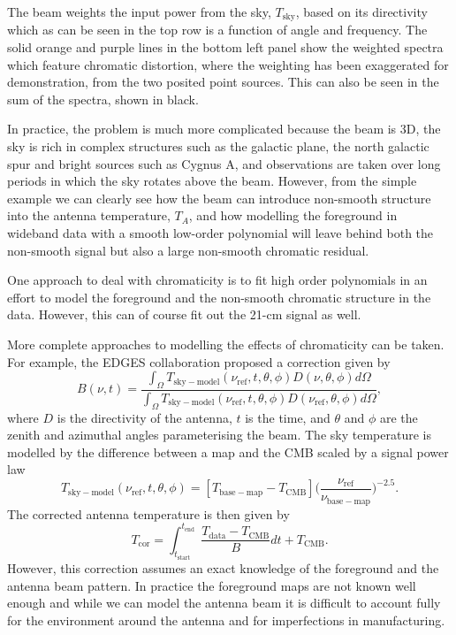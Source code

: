 The beam weights the input power from the sky, $T_\mathrm{sky}$, based on its directivity which as can be seen in the top row is a function of angle and frequency. The solid orange and purple lines in the bottom left panel show the weighted spectra which feature chromatic distortion, where the weighting has been exaggerated for demonstration, from the two posited point sources. This can also be seen in the sum of the spectra, shown in black.

In practice, the problem is much more complicated because the beam is 3D, the sky is rich in complex structures such as the galactic plane, the north galactic spur and bright sources such as Cygnus A, and observations are taken over long periods in which the sky rotates above the beam. However, from the simple example we can clearly see how the beam can introduce non-smooth structure into the antenna temperature, $T_A$, and how modelling the foreground in wideband data with a smooth low-order polynomial will leave behind both the non-smooth signal but also a large non-smooth chromatic residual.

One approach to deal with chromaticity is to fit high order polynomials in an effort to model the foreground and the non-smooth chromatic structure in the data. However, this can of course fit out the 21-cm signal as well.

More complete approaches to modelling the effects of chromaticity can be taken. For example, the EDGES collaboration \cite{Mozdzen_EDGES_spectral_index_2017} proposed a correction given by
\begin{equation}
    B(\nu, t) = \frac{\int_\Omega T_\mathrm{sky-model}(\nu_\mathrm{ref}, t, \theta, \phi) D(\nu, \theta, \phi) d\Omega}{\int_\Omega T_\mathrm{sky-model}(\nu_\mathrm{ref}, t, \theta, \phi) D(\nu_\mathrm{ref}, \theta, \phi) d\Omega},
\end{equation}
where $D$ is the directivity of the antenna, $t$ is the time, and $\theta$ and $\phi$ are the zenith and azimuthal angles parameterising the beam. The sky temperature is modelled by the difference between a map and the CMB scaled by a signal power law
\begin{equation}
    T_\mathrm{sky-model} (\nu_\mathrm{ref}, t, \theta, \phi) = [T_\mathrm{base-map} - T_\mathrm{CMB}]\bigg(\frac{\nu_\mathrm{ref}}{\nu_\mathrm{base-map}}\bigg)^{-2.5}.
\end{equation}
The corrected antenna temperature is then given by
\begin{equation}
    T_\mathrm{cor} = \int_{t_\mathrm{start}}^{t_\mathrm{end}} \frac{T_\mathrm{data} - T_\mathrm{CMB}}{B} dt + T_\mathrm{CMB}.
\end{equation}
However, this correction assumes an exact knowledge of the foreground and the antenna beam pattern. In practice the foreground maps are not known well enough and while we can model the antenna beam it is difficult to account fully for the environment around the antenna and for imperfections in manufacturing.


